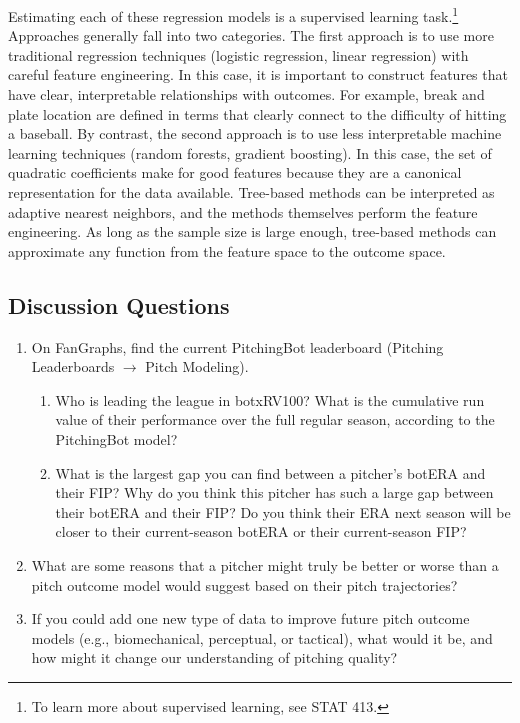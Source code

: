 \documentclass{article}
\begin{document}
    Estimating each of these regression models is a supervised learning task.\footnote{To learn more about supervised learning, see STAT 413.} Approaches generally fall into two categories. The first approach is to use more traditional regression techniques (logistic regression, linear regression) with careful feature engineering. In this case, it is important to construct features that have clear, interpretable relationships with outcomes. For example, break and plate location are defined in terms that clearly connect to the difficulty of hitting a baseball. By contrast, the second approach is to use less interpretable machine learning techniques (random forests, gradient boosting). In this case, the set of quadratic coefficients make for good features because they are a canonical representation for the data available. Tree-based methods can be interpreted as adaptive nearest neighbors, and the methods themselves perform the feature engineering. As long as the sample size is large enough, tree-based methods can approximate any function from the feature space to the outcome space.

  \subsection{\sc Discussion Questions}

    \begin{enumerate}
      \item On FanGraphs, find the current PitchingBot leaderboard (Pitching Leaderboards $\rightarrow$ Pitch Modeling).
      \begin{enumerate}
        \item Who is leading the league in botxRV100? What is the cumulative run value of their performance over the full regular season, according to the PitchingBot model?
        \item What is the largest gap you can find between a pitcher's botERA and their FIP? Why do you think this pitcher has such a large gap between their botERA and their FIP? Do you think their ERA next season will be closer to their current-season botERA or their current-season FIP?
      \end{enumerate}
      \item What are some reasons that a pitcher might truly be better or worse than a pitch outcome model would suggest based on their pitch trajectories?
      \item If you could add one new type of data to improve future pitch outcome models (e.g., biomechanical, perceptual, or tactical), what would it be, and how might it change our understanding of pitching quality?
    \end{enumerate}
\end{document}
